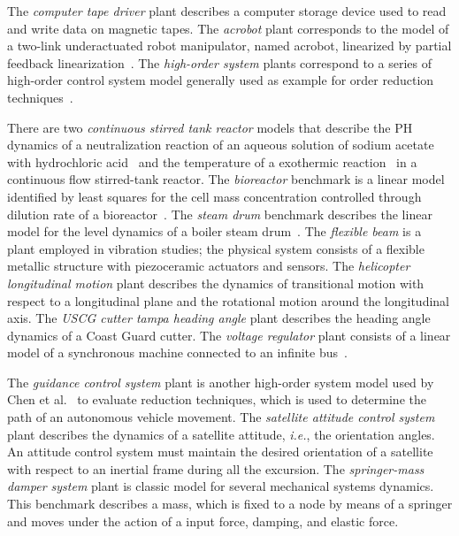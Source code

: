 \documentclass[twocolumn]{autart}    %
\begin{document}
The \textit{computer tape driver} plant describes a computer storage device used to read and write 
data on magnetic tapes. The \textit{acrobot} plant corresponds to the model of a two-link 
underactuated robot manipulator, named acrobot, linearized by partial 
feedback linearization~\cite{acrobot}. 
The \textit{high-order system} plants correspond to a series of high-order control system model 
generally used as example for order reduction techniques~\cite{CHEN1979389}.

There are two \textit{continuous stirred tank reactor} models that describe the PH dynamics of a neutralization 
reaction of an aqueous solution of sodium acetate with hydrochloric acid~\cite{cstr} and the temperature of a 
exothermic reaction~\cite{astrom2006advanced} in a continuous flow stirred-tank reactor. The \textit{bioreactor} 
benchmark is a linear model identified by least squares for the cell mass concentration controlled through dilution 
rate of a bioreactor~\cite{bioreactor}. The \textit{steam drum} benchmark describes the linear model for the 
level dynamics of a  boiler steam drum~\cite{boiler}.
The \textit{flexible beam} is a plant employed in vibration studies; the physical system consists of a flexible 
metallic structure with piezoceramic actuators and sensors.
The \textit{helicopter longitudinal motion} plant describes the dynamics of 
transitional motion with respect to a longitudinal plane and the 
rotational motion around the longitudinal axis.
The \textit{USCG cutter tampa heading angle} plant describes the heading angle 
dynamics of a Coast Guard cutter. 
The \textit{voltage regulator} plant consists of a linear model of a synchronous 
machine connected to an  infinite bus~\cite{KOKOTOVIC198023}.

The \textit{guidance control system} plant is another high-order system 
model used by Chen et al.~\cite{CHEN1979389}  to evaluate reduction 
techniques, which is used to determine the path of an autonomous vehicle movement.
The \textit{satellite attitude control system} plant describes the dynamics of a satellite attitude, 
{\it i.e.}, the orientation angles. An attitude control system must 
maintain the desired orientation of a satellite with respect to an 
inertial frame during all the excursion. 
The \textit{springer-mass damper system} plant is classic model for several mechanical 
systems dynamics. This benchmark describes a mass, which is fixed to a node by means 
of a springer and moves under the action of a input force, damping, and elastic force.
\end{document}
